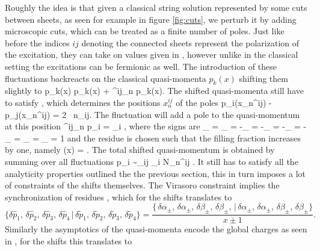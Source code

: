 Roughly the idea is that given a classical string solution represented by some cuts between sheets, as seen for example in figure \ref{fig:cuts}, we perturb it by adding microscopic cuts, which can be treated as a finite number of poles.
Just like before the indices $ij$ denoting the connected sheets represent the polarization of the excitation, they can take on values given in , however unlike in the classical setting the excitations can be fermionic as well.
The introduction of these fluctuations backreacts on the classical quasi-momenta $p_k(x)$ shifting them slightly to
\beq
	p_k(x) \rightarrow p_k(x) + \delta^{ij}_n p_k(x).
\eeq
The shifted quasi-momenta still have to satisfy , which determines the positions $x_n^{ij}$ of the poles
\beq
	\label{eq:pole_pos}
	p_i(x_n^{ij}) - p_j(x_n^{ij}) = 2 \pi \, n_{ij}.
\eeq
The fluctuation will add a pole to the quasi-momentum at this position
\beq
	\delta^{ij}_n p_i = \epsilon_i ,
\eeq
where the signs are
\beq
	\epsilon_{} = \epsilon_{} = -\epsilon_{} = -\epsilon_{} = -\epsilon_{} = -\epsilon_{} = \epsilon_{} = \epsilon_{} = 1
\eeq
and the residue is chosen such that the filling fraction  increases by one, namely
\beq
	\alpha(x) = \frac{4\pi}{\sqrt{\lambda}} .
\eeq
The total shifted quasi-momentum is obtained by summing over all fluctuations
\beq
	\delta p_i \sim \sum_{ij} \epsilon_i N_n^{ij} .
\eeq
It still has to satisfy all the analyticity properties outlined the the previous section, this in turn imposes a lot of constraints of the shifts themselves.
The Virasoro constraint implies the synchronization of residues , which for the shifts translates to
\begin{equation}
	\{ \delta\hat{p}_1, \, \delta\hat{p}_2, \, \delta\hat{p}_3, \, \delta\hat{p}_4 \, | \, \delta\tilde{p}_1, \, \delta\tilde{p}_2, \, \delta\tilde{p}_3, \, \delta\tilde{p}_4 \} = \frac{\{ \, \delta\alpha_{\pm}, \, \delta\alpha_{\pm}, \, \delta\beta_{\pm}, \, \delta\beta_{\pm}, \, | \, \delta\alpha_{\pm}, \, \delta\alpha_{\pm}, \, \delta\beta_{\pm}, \, \delta\beta_{\pm} \}}{x \pm 1}.
\end{equation}
Similarly the asymptotics of the quasi-momenta encode the global charges as seen in , for the shifts this translates to
